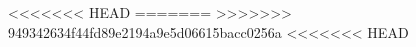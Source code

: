 \documentclass[aspectratio=169]{beamer}
\begin{document}
<<<<<<< HEAD
=======
>>>>>>> 949342634f44fd89e2194a9e5d06615bacc0256a
<<<<<<< HEAD
%
%
\end{document}
